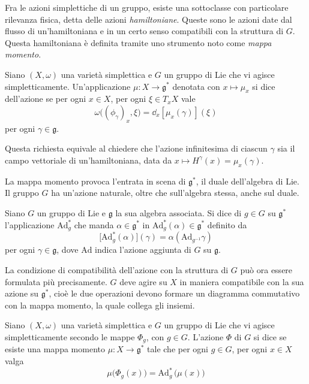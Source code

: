 Fra le azioni simplettiche di un gruppo, esiste una sottoclasse con particolare rilevanza fisica, detta delle azioni \emph{hamiltoniane}. Queste sono le azioni date dal flusso di un'hamiltoniana e in un certo senso compatibili con la struttura di $G$. Questa hamiltoniana è definita tramite uno strumento noto come \emph{mappa momento}.
\begin{definition}
  Siano $(X,\omega)$ una varietà simplettica e $G$ un gruppo di Lie che vi agisce simpletticamente. Un'applicazione $\mu: X\to \mathfrak{g}^*$ denotata con $x \mapsto \mu_x$ si dice  dell'azione se per ogni $x \in X$, per ogni $\xi \in T_x X$ vale
  \begin{equation*}
  \omega\big((\phi_{\gamma})_x, \xi\big) = \dd_x [\mu_x(\gamma)](\xi)
  \end{equation*} 
  per ogni $\gamma \in \mathfrak{g}$.
\end{definition}
\begin{remark}
  Questa richiesta equivale al chiedere che l'azione infinitesima di ciascun $\gamma$ sia il campo vettoriale di un'hamiltoniana, data da $x \mapsto H^{\gamma}(x) = \mu_x(\gamma)$.
\end{remark}

La mappa momento provoca l'entrata in scena di $\mathfrak{g}^*$, il duale dell'algebra di Lie. Il gruppo $G$ ha un'azione naturale, oltre che sull'algebra stessa, anche sul duale.
\begin{definition}
  Siano $G$ un gruppo di Lie e $\mathfrak{g}$ la sua algebra associata. Si dice  di $g \in G$ su $\mathfrak{g}^*$ l'applicazione $\mathrm{Ad}_g^*$ che manda $\alpha \in \mathfrak{g}^*$ in $\mathrm{Ad}^*_g(\alpha) \in \mathfrak{g}^*$ definito da
  \begin{equation*}
  \big[\mathrm{Ad}^*_g(\alpha)\big](\gamma) = \alpha(\mathrm{Ad}_{g^{-1}}\gamma)
  \end{equation*}
  per ogni $\gamma \in \mathfrak{g}$, dove $\mathrm{Ad}$ indica l'azione aggiunta di $G$ su $\mathfrak{g}$.
\end{definition}

La condizione di compatibilità dell'azione con la struttura di $G$ può ora essere formulata più precisamente. $G$ deve agire su $X$ in maniera compatibile con la sua azione su $\mathfrak{g}^*$, cioè le due operazioni devono formare un diagramma commutativo con la mappa momento, la quale collega gli insiemi. 
\begin{definition}
  Siano $(X, \omega)$ una varietà simplettica e $G$ un gruppo di Lie che vi agisce simpletticamente secondo le mappe $\Phi_g$, con $g \in G$. L'azione $\Phi$ di $G$ si dice  se esiste una mappa momento $\mu: X \to \mathfrak{g}^*$ tale che per ogni $g \in G$, per ogni $x \in X$ valga
  \begin{equation*}
  \mu\big(\Phi_g(x)\big) = \mathrm{Ad}_g^*\, \big(\mu(x)\big)
  \end{equation*} 
\end{definition}

